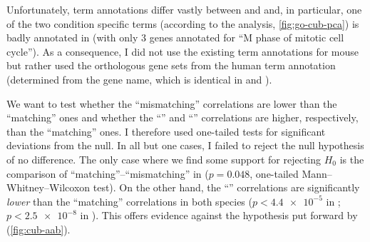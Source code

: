 Unfortunately, \go term annotations differ vastly between \hsa and \mmu and, in
particular, one of the two condition specific \go terms (according to the \pca
analysis, \cref{fig:go-cub-pca}) is badly annotated in \mmu (with only \num{3}
genes annotated for “M phase of mitotic cell cycle”). As a consequence, I did
not use the existing \go term annotations for mouse but rather used the
orthologous gene sets from the human \go term annotation (determined from the
gene name, which is identical in \mmu and \hsa \citep{Wain:2002}).

We want to test whether the “mismatching” correlations are lower than the
“matching” ones and whether the “” and “” correlations are
higher, respectively, than the “matching” ones. I therefore used one-tailed
tests for significant deviations from the null. In all but one cases, I failed
to reject the null hypothesis of no difference. The only case where we find some
support for rejecting \(H_0\) is the comparison of “matching”--“mismatching” in
\hsa (\(p = 0.048\), one-tailed Mann–Whitney–Wilcoxon test). On the other hand,
the “” correlations are significantly \emph{lower} than the “matching”
correlations in both species (\(p < \num{4.4e-5}\) in \mmu; \(p < \num{2.5e-8}\)
in \hsa). This offers evidence against the hypothesis put forward by
\citet{Gingold:2014} (\cref{fig:cub-aab}).


